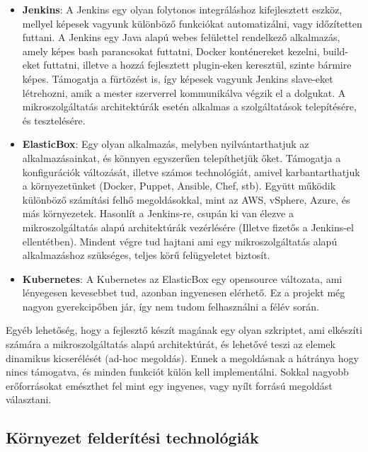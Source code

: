 \documentclass[11pt,magyar,a4paper,twoside,]{report}
\begin{document}
\begin{itemize}
\item
  \textbf{Jenkins}\citep{jenkins}: A Jenkins egy olyan folytonos
  integráláshoz kifejlesztett eszköz, mellyel képesek vagyunk különböző
  funkciókat automatizálni, vagy időzítetten futtani. A Jenkins egy Java
  alapú webes felülettel rendelkező alkalmazás, amely képes bash
  parancsokat futtatni, Docker konténereket kezelni, build-eket
  futtatni, illetve a hozzá fejlesztett plugin-eken keresztül, szinte
  bármire képes. Támogatja a fürtözést is, így képesek vagyunk Jenkins
  slave-eket létrehozni, amik a mester szerverrel kommunikálva végzik el
  a dolgukat. A mikroszolgáltatás architektúrák esetén alkalmas a
  szolgáltatások telepítésére, és tesztelésére.
\item
  \textbf{ElasticBox}\citep{elasticbox}: Egy olyan alkalmazás, melyben
  nyilvántarthatjuk az alkalmazásainkat, és könnyen egyszerűen
  telepíthetjük őket. Támogatja a konfigurációk változását, illetve
  számos technológiát, amivel karbantarthatjuk a környezetünket (Docker,
  Puppet, Ansible, Chef, stb). Együtt működik különböző számítási felhő
  megoldásokkal, mint az AWS, vSphere, Azure, és más környezetek.
  Hasonlít a Jenkins-re, csupán ki van élezve a mikroszolgáltatás alapú
  architektúrák vezérlésére (Illetve fizetős a Jenkins-el ellentétben).
  Mindent végre tud hajtani ami egy mikroszolgáltatás alapú
  alkalmazáshoz szükséges, teljes körű felügyeletet biztosít.
  \citep{jenkins-elasticbox}
\item
  \textbf{Kubernetes}\citep{kubernetes}: A Kubernetes az ElasticBox egy
  opensource változata, ami lényegesen kevesebbet tud, azonban
  ingyenesen elérhető. Ez a projekt még nagyon gyerekcipőben jár, így
  nem tudom felhasználni a félév során.
\end{itemize}

Egyéb lehetőség, hogy a fejlesztő készít magának egy olyan szkriptet,
ami elkészíti számára a mikroszolgáltatás alapú architektúrát, és
lehetővé teszi az elemek dinamikus kicserélését (ad-hoc megoldás). Ennek
a megoldásnak a hátránya hogy nincs támogatva, és minden funkciót külön
kell implementálni. Sokkal nagyobb erőforrásokat emészthet fel mint egy
ingyenes, vagy nyílt forrású megoldást választani.

\subsection{Környezet felderítési
technológiák}\label{kuxf6rnyezet-felderuxedtuxe9si-technoluxf3giuxe1k}
\end{document}

